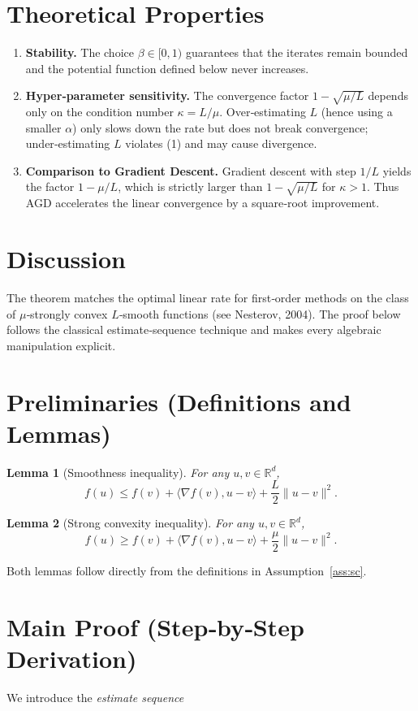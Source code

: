 \documentclass{article}
\newtheorem{lemma}{Lemma}
\begin{document}
\section*{Theoretical Properties}
\begin{enumerate}
    \item \textbf{Stability.}  The choice $\beta\in[0,1)$ guarantees that the
    iterates remain bounded and the potential function defined below never
    increases.
    \item \textbf{Hyper‑parameter sensitivity.}
    The convergence factor $1-\sqrt{\mu/L}$ depends only on the condition number
    $\kappa=L/\mu$.  Over‑estimating $L$ (hence using a smaller $\alpha$) only
    slows down the rate but does not break convergence; under‑estimating $L$
    violates (1) and may cause divergence.
    \item \textbf{Comparison to Gradient Descent.}
    Gradient descent with step $1/L$ yields the factor $1-\mu/L$, which is
    strictly larger than $1-\sqrt{\mu/L}$ for $\kappa>1$.  Thus AGD accelerates
    the linear convergence by a square‑root improvement.
\end{enumerate}

\section*{Discussion}
The theorem matches the optimal linear rate for first‑order methods on the
class of $\mu$‑strongly convex $L$‑smooth functions (see Nesterov, 2004).  The
proof below follows the classical estimate‑sequence technique and makes every
algebraic manipulation explicit.

\section*{Preliminaries (Definitions and Lemmas)}
\begin{lemma}[Smoothness inequality]\label{lem:smooth}
For any $u,v\in\mathbb{R}^{d}$,
\[
f(u)\le f(v)+\langle\nabla f(v),u-v\rangle+\frac{L}{2}\|u-v\|^{2}.
\]
\end{lemma}
\begin{lemma}[Strong convexity inequality]\label{lem:strong}
For any $u,v\in\mathbb{R}^{d}$,
\[
f(u)\ge f(v)+\langle\nabla f(v),u-v\rangle+\frac{\mu}{2}\|u-v\|^{2}.
\]
\end{lemma}
Both lemmas follow directly from the definitions in Assumption~\ref{ass:sc}.

\section*{Main Proof (Step‑by‑Step Derivation)}
We introduce the \emph{estimate sequence}  
\end{document}
